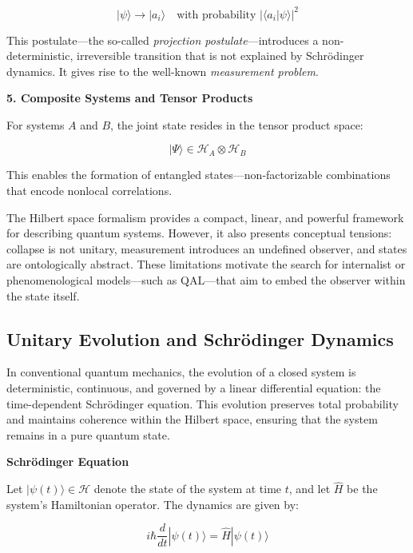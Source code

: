 \documentclass[11pt]{article}
\numberwithin{equation}{section} %
\begin{document}
\begin{equation}
|\psi\rangle \rightarrow |a_i\rangle \quad \text{with probability } |\langle a_i | \psi \rangle|^2
\end{equation}

This postulate—the so-called \textit{projection postulate}—introduces a non-deterministic, irreversible transition that is not explained by Schrödinger dynamics. It gives rise to the well-known \textit{measurement problem}.

\bigskip

\noindent\textbf{5. Composite Systems and Tensor Products}

For systems \( A \) and \( B \), the joint state resides in the tensor product space:

\begin{equation}
|\Psi\rangle \in \mathcal{H}_A \otimes \mathcal{H}_B
\end{equation}

This enables the formation of entangled states—non-factorizable combinations that encode nonlocal correlations.

The Hilbert space formalism provides a compact, linear, and powerful framework for describing quantum systems. However, it also presents conceptual tensions: collapse is not unitary, measurement introduces an undefined observer, and states are ontologically abstract. These limitations motivate the search for internalist or phenomenological models—such as QAL—that aim to embed the observer within the state itself.

\subsection{Unitary Evolution and Schrödinger Dynamics}

In conventional quantum mechanics, the evolution of a closed system is deterministic, continuous, and governed by a linear differential equation: the time-dependent Schrödinger equation. This evolution preserves total probability and maintains coherence within the Hilbert space, ensuring that the system remains in a pure quantum state.

\bigskip

\noindent\textbf{Schrödinger Equation}

Let \( |\psi(t)\rangle \in \mathcal{H} \) denote the state of the system at time \( t \), and let \( \hat{H} \) be the system’s Hamiltonian operator. The dynamics are given by:

\begin{equation}
i\hbar \frac{d}{dt} |\psi(t)\rangle = \hat{H} |\psi(t)\rangle
\end{equation}
\end{document}
